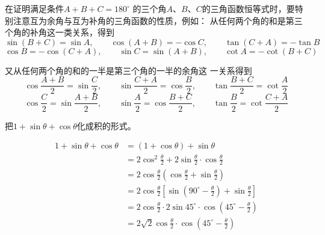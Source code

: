 \begin{rmk}
    在证明满足条件$A+B+C=180^{\circ}$ 的三个角$A$、$B$、$C$的三角函数恒等式时，要特别注意互为余角与互为补角的三角函数的性质，例如：    
从任何两个角的和是第三个角的补角这一类关系，得到
\[\sin (B+C) =\sin A,\qquad  \cos (A+B) = - \cos C,\qquad \tan (C+A) =-\tan B\]
\[\cos B= -\cos (C+A),\qquad \sin C=\sin (A+B) ,\qquad  \cot A=-\cot (B+C)\]

又从任何两个角的和的一半是第三个角的一半的余角这
一关系得到
\[\cos\frac{A+B}{2}=\sin\frac{C}{2},\qquad \sin\frac{C+A}{2}=\cos\frac{B}{2},\qquad \tan\frac{B+C}{2}=\cot\frac{A}{2}\]
\[\cos\frac{C}{2}=\sin\frac{A+B}{2},\qquad \sin\frac{A}{2}=\cos\frac{B+C}{2},\qquad \tan\frac{B}{2}=\cot\frac{C+A}{2}\]
\end{rmk}


\begin{example}
    把$1+\sin\theta+\cos\theta$化成积的形式。
\end{example}

\begin{solution}
\[\begin{split}
1+\sin\theta+\cos\theta&=(1+\cos\theta)+\sin\theta\\
&=2\cos^2\frac{\theta}{2}+2\sin\frac{\theta}{2}\cdot \cos\frac{\theta}{2}\\
&=2\cos\frac{\theta}{2}\left(\cos\frac{\theta}{2}+\sin\frac{\theta}{2}\right)\\
&=2\cos\frac{\theta}{2}\left[\sin\left(90^{\circ}-\frac{\theta}{2}\right)+\sin \frac{\theta}{2}\right]\\
&=2\cos\frac{\theta}{2}\cdot 2\sin 45^{\circ}\cdot \cos\left(45^{\circ}-\frac{\theta}{2}\right)\\
&=2\sqrt{2}\cos \frac{\theta}{2}\cdot \cos\left(45^{\circ}-\frac{\theta}{2}\right)
\end{split}\]
\end{solution}

